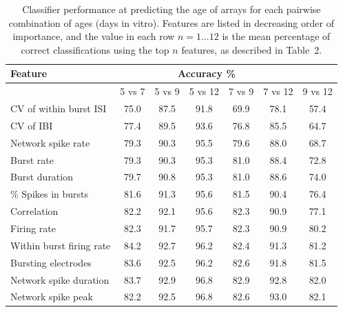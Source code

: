 \documentclass{article}\usepackage[]{graphicx}\usepackage[]{color}
\begin{document}
\begin{table}
  \centering
  \begin{tabular}{|l|c|c|c|c|c|c|}
	  \hline
	  \textbf{Feature} & \multicolumn{5}{c}{\textbf{Accuracy \%}} & 
	  \\ \hline
	  & 5 vs 7 & 5 vs 9 & 5 vs 12 & 7 vs 9 & 7 vs 12 & 9 vs 12
	  \\ \hline 
		CV of within burst ISI & 75.0 & 87.5 & 91.8 & 69.9& 78.1 & 57.4
		\\ CV of IBI & 77.4 & 89.5 & 93.6 & 76.8 & 85.5 & 64.7
		\\ Network spike rate& 79.3 & 90.3 & 95.5  & 79.6 & 88.0 & 68.7
		\\ Burst rate & 79.3 & 90.3 & 95.3 & 81.0 & 88.4 & 72.8
		\\ Burst duration& 79.7 & 90.8 & 95.3 & 81.0 & 88.6 & 74.0
		\\ \% Spikes in bursts & 81.6 & 91.3 & 95.6 & 81.5 & 90.4 & 76.4
		\\ Correlation & 82.2 & 92.1 & 95.6 & 82.3 & 90.9 & 77.1
		\\ Firing rate & 82.3 & 91.7 & 95.7 & 82.3 & 90.9 & 80.2
		\\ Within burst firing rate & 84.2 & 92.7 & 96.2 & 82.4 & 91.3 & 81.2
		\\ Bursting electrodes & 83.6 & 92.5 & 96.2 & 82.6 & 91.8 & 81.5
		\\ Network spike duration & 83.7 & 92.9 & 96.8 & 82.9 & 92.8 & 82.0
		\\ Network spike peak & 82.2 & 92.5 & 96.8 & 82.6 & 93.0 & 82.1
	\\ \hline
\end{tabular}
  \caption{Classifier performance at predicting the age of arrays for
    each pairwise combination of ages (days in vitro). Features are listed in
    decreasing order of importance, and the value in each row
    $n=1 \ldots 12$ is the mean percentage of correct classifications using
    the top $n$ features, as described in Table~2.}
\end{table}


 
 
\end{document}
